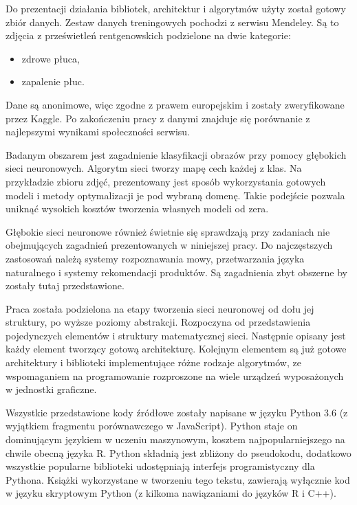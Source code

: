 \documentclass[12pt,a4paper,twoside,titlepage,openright]{book}
\begin{document}
Do prezentacji działania bibliotek, architektur i algorytmów użyty został gotowy zbiór danych. Zestaw danych treningowych pochodzi z serwisu Mendeley. Są to zdjęcia z prześwietleń rentgenowskich podzielone na dwie kategorie:
\begin{itemize}
\item zdrowe płuca,
\item zapalenie płuc.
\end{itemize} 
Dane są anonimowe, więc zgodne z prawem europejskim i zostały zweryfikowane przez Kaggle. Po zakończeniu pracy z danymi znajduje się porównanie z najlepszymi wynikami społeczności serwisu.\cite{siteMendeley}

Badanym obszarem jest zagadnienie klasyfikacji obrazów przy pomocy głębokich sieci neuronowych. Algorytm sieci tworzy mapę cech każdej z klas. Na przykładzie zbioru zdjęć, prezentowany jest sposób wykorzystania gotowych modeli i metody optymalizacji je pod wybraną domenę. Takie podejście pozwala uniknąć wysokich kosztów tworzenia własnych modeli od zera.

Głębokie sieci neuronowe również świetnie się sprawdzają przy zadaniach nie obejmujących zagadnień prezentowanych w niniejszej pracy. Do najczęstszych zastosowań należą systemy rozpoznawania mowy, przetwarzania języka naturalnego i systemy rekomendacji produktów. Są zagadnienia zbyt obszerne by zostały tutaj przedstawione.

Praca została podzielona na etapy tworzenia sieci neuronowej od dołu jej struktury, po wyższe poziomy abstrakcji. Rozpoczyna od przedstawienia pojedynczych elementów i struktury matematycznej sieci. Następnie opisany jest każdy element tworzący gotową architekturę. Kolejnym elementem są już gotowe architektury i biblioteki implementujące różne rodzaje algorytmów, ze wspomaganiem na programowanie rozproszone na wiele urządzeń wyposażonych w jednostki graficzne.

Wszystkie przedstawione kody źródłowe zostały napisane w języku Python 3.6 (z wyjątkiem fragmentu porównawczego w JavaScript). Python staje on dominującym językiem w uczeniu maszynowym, kosztem najpopularniejszego na chwile obecną języka R.\cite{sitePythonvR} Python składnią jest zbliżony do pseudokodu, dodatkowo wszystkie popularne biblioteki udostępniają interfejs programistyczny dla Pythona. Książki wykorzystane w tworzeniu tego tekstu, zawierają wyłącznie kod w języku skryptowym Python (z kilkoma nawiązaniami do języków R i C++).

\end{document}
